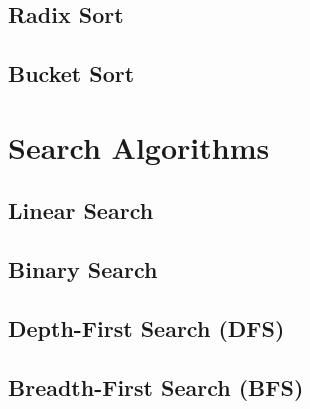 \documentclass[11pt]{article}
\begin{document}
        \subsection{Radix Sort}
            

        \subsection{Bucket Sort}
            

\section{Search Algorithms}


        \subsection{Linear Search}
        \subsection{Binary Search}
        \subsection{Depth-First Search (DFS)}
        \subsection{Breadth-First Search (BFS)}


        \subsection{}
        \subsection{}
        \subsection{}
        \subsection{}
        \subsection{}
        \subsection{}
        \subsection{}
        \subsection{}
\end{document}
